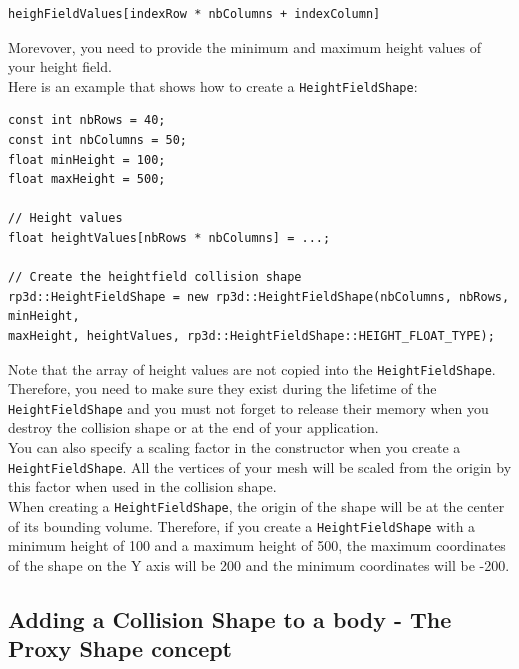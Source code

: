 \documentclass[a4paper,12pt]{article}
\begin{document}
  \begin{lstlisting}
heighFieldValues[indexRow * nbColumns + indexColumn]
  \end{lstlisting}

  \vspace{0.6cm}

  Morevover, you need to provide the minimum and maximum height values of your height field. \\

  Here is an example that shows how to create a \texttt{HeightFieldShape}: \\

  \begin{lstlisting}
const int nbRows = 40;
const int nbColumns = 50;
float minHeight = 100;
float maxHeight = 500;

// Height values
float heightValues[nbRows * nbColumns] = ...;

// Create the heightfield collision shape
rp3d::HeightFieldShape = new rp3d::HeightFieldShape(nbColumns, nbRows, minHeight,
maxHeight, heightValues, rp3d::HeightFieldShape::HEIGHT_FLOAT_TYPE);
  \end{lstlisting}

  \vspace{0.6cm}

  Note that the array of height values are not copied into the \texttt{HeightFieldShape}. Therefore, you need to make sure
  they exist during the lifetime of the \texttt{HeightFieldShape} and you must not forget to release their memory when you
  destroy the collision shape or at the end of your application. \\

  You can also specify a scaling factor in the constructor when you create a \texttt{HeightFieldShape}. All the vertices of your mesh will be scaled from the origin by this factor
  when used in the collision shape. \\

  When creating a \texttt{HeightFieldShape}, the origin of the shape will be at the center of its bounding volume.
  Therefore, if you create a \texttt{HeightFieldShape} with a minimum height of 100 and a maximum height of 500, the
  maximum coordinates of the shape on the Y axis will be 200 and the minimum coordinates will be -200.

    \subsection{Adding a Collision Shape to a body - The Proxy Shape concept}
\end{document}
